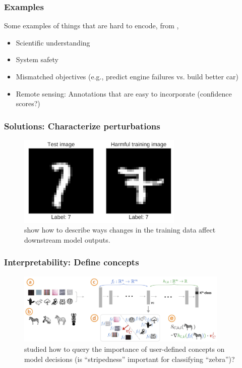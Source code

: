 \documentclass[10pt,mathserif]{beamer}
\begin{document}
\begin{frame}
  \frametitle{Examples}
  Some examples of things that are hard to encode, from
  \citep{doshi2017towards},
  \begin{itemize}
  \item Scientific understanding
  \item System safety
  \item Mismatched objectives (e.g., predict engine failures vs. build better
    car)
  \item Remote sensing: Annotations that are easy to incorporate (confidence
    scores?)
  \end{itemize}
\end{frame}

\begin{frame}
  \frametitle{Solutions: Characterize perturbations}
\begin{figure}[ht]
  \centering
  \includegraphics[width=0.7\textwidth]{figures/influence}
  \caption{\citep{koh2017understanding} show how to describe ways changes in the
    training data affect downstream model outputs. \label{fig:label} }
\end{figure}
\end{frame}

\begin{frame}
  \frametitle{Interpretability: Define concepts}
  \begin{figure}[ht]
    \centering
    \includegraphics[width=0.9\textwidth]{figures/concepts}
    \caption{\citep{kim2017interpretability} studied how to query the importance
      of user-defined concepts on model decisions (is ``stripedness'' important
      for classifying ``zebra'')?}
  \end{figure}
\end{frame}
\end{document}
